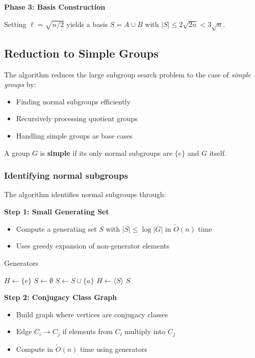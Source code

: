 \documentclass[sigconf]{acmart}
\begin{document}
\textbf{Phase 3: Basis Construction}
\begin{corollary}
Setting $\ell = \sqrt{n/2}$ yields a basis $S = A \cup B$ with $|S| \leq 2\sqrt{2n} < 3\sqrt{n}$.
\end{corollary}


\subsection{Reduction to Simple Groups}
\label{sec:simple-groups}

The algorithm reduces the large subgroup search problem to the case of \emph{simple groups} by:
\begin{itemize}
    \item Finding normal subgroups efficiently
    \item Recursively processing quotient groups
    \item Handling simple groups as base cases
\end{itemize}

\begin{definition}
A group \( G \) is \textbf{simple} if its only normal subgroups are \( \{e\} \) and \( G \) itself.
\end{definition}

\subsubsection{Identifying normal subgroups}
The algorithm identifies normal subgroups through:

\textbf{Step 1: Small Generating Set}
\begin{itemize}
    \item Compute a generating set \( S \) with \( |S| \leq \log|G| \) in \( \widetilde{O}(n) \) time
    \item Uses greedy expansion of non-generator elements
\end{itemize}

\begin{algorithm}[H]
\caption{Generators}
\begin{algorithmic}[1]
\STATE \( H \gets \{e\} \)
\STATE \( S \gets \emptyset \)
        \STATE \( S \gets S \cup \{a\} \)
        \STATE \( H \gets \langle S \rangle \)
    \ENDIF
\ENDFOR
\RETURN \( S \)
\end{algorithmic}
\end{algorithm}

\textbf{Step 2: Conjugacy Class Graph}
\begin{itemize}
    \item Build graph where vertices are conjugacy classes
    \item Edge \( C_i \to C_j \) if elements from \( C_i \) multiply into \( C_j \)
    \item Compute in \( \widetilde{O}(n) \) time using generators
\end{itemize}
\end{document}

